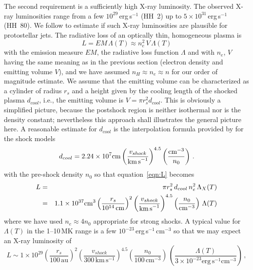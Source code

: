 \documentclass[graybox, nosecnum]{svmult}
\begin{document}
The second requirement is a sufficiently high X-ray luminosity. The observed X-ray luminosities range from a few $10^{29}$\,erg\,s$^{-1}$ (HH~2) up to $5\times10^{31}$\,erg\,s$^{-1}$ (HH~80). We follow \citet{Raga_2002} to estimate if such X-ray luminosities are plausible for protostellar jets. The radiative loss of an optically thin, homogeneous plasma is 
\begin{equation}
L = EM\, \Lambda(T) \approx n_e^2\, V\,\Lambda(T)  \label{eqn:L}
\end{equation} 
with the emission measure $EM$, the radiative loss function $\Lambda$ and with $n_e$, $V$ having the same meaning as in the previous section (electron density and emitting volume $V$), and we have assumed $n_H\approx n_e \approx n$ for our order of magnitude estimate. We assume that the emitting volume can be characterized as a cylinder of radius $r_s$ and a height given by the cooling length of the shocked plasma $d_{cool}$, i.e., the  emitting volume is $V = \pi r_s^2 d_{cool}$. This is obviously a simplified picture, because the postshock region is neither isothermal nor is the density constant; nevertheless this approach shall illustrates the general picture here. A reasonable estimate for $d_{cool}$ is the interpolation formula provided by \citet{Heathcote_1998} for the \citet{Hartigan_1987} shock models
\begin{equation}
d_{cool} = 2.24\times10^7 \textrm{cm} \left(\frac{v_{shock} }{\textrm{km\,s}^{-1}} \right)^{4.5} \left(\frac{\textrm{cm}^{-3}}{n_0} \right)\,. \label{eq:dcool}
\end{equation}
with the pre-shock density $n_0$ so that equation~\ref{eqn:L} becomes
\begin{eqnarray}
L & = & \pi r_s^2  \, d_{cool} \, n_e^2\,\Lambda_X(T) \label{eq:L}\\
  & = &  1.1\times10^{37} \textrm{cm}^3 \left(\frac{r_s}{10^{14}\,\textrm{cm}}\right)^2 \left(\frac{v_{shock} }{\textrm{km\,s}^{-1}} \right)^{4.5} \left(\frac{n_0}{\textrm{cm}^{-3}} \right) \, \Lambda(T)
\end{eqnarray}
where we have used $n_e\approx4n_0$ appropriate for strong shocks. A typical value for $\Lambda(T)$ in the 1--10\,MK range is a few $10^{-23}$\,erg\,s$^{-1}\,$cm$^{-3}$ so that we may expect an X-ray luminosity of
\begin{equation}
L \sim 1\times10^{29} \left(\frac{r_s}{100\,\textrm{au}}\right)^2 \left(\frac{v_{shock}}{300\,\textrm{km}\,\textrm{s}^{-1}}\right)^{4.5} \left(\frac{n_0}{100\,\textrm{cm}^{-3}} \right) \, \left( \frac{\Lambda(T)}{3\times10^{-23} \textrm{erg}\, \textrm{s}^{-1} \textrm{cm}^{-3}} \right)\,,
\end{equation}
\end{document}
